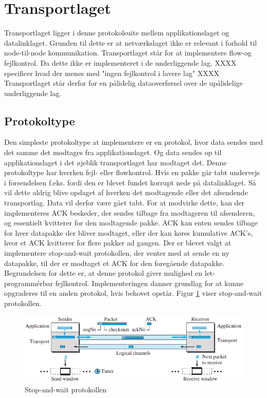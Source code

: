 \section{Transportlaget}
Transportlaget ligger i denne protokolsuite mellem applikationslaget og datalinklaget. Grunden til dette er at netværkslaget ikke er relevant i forhold til node-til-node kommunikation. Transportlaget står for at implementere flow-og fejlkontrol. Da dette ikke er implementeret i de underliggende lag. XXXX specificer hvad der menes med "ingen fejlkontrol i lavere lag" XXXX Transportlaget står derfor for en pålidelig dataoverførsel over de upålidelige underliggende lag.

\subsection{Protokoltype}
Den simpleste protokoltype at implementere er en protokol, hvor data sendes med det samme det modtages fra applikationslaget. Og data sendes op til applikationslaget i det øjeblik transportlaget har modtaget det. Denne protokoltype har hverken fejl- eller flowkontrol. Hvis en pakke går tabt undervejs i forsendelsen f.eks. fordi den er blevet fundet korrupt nede på datalinklaget. Så vil dette aldrig blive opdaget af hverken det modtagende eller det afsendende transportlag. Data vil derfor være gået tabt. For at modvirke dette, kan der implementeres ACK beskeder, der sendes tilbage fra modtageren til afsenderen, og essentielt kvitterer for den modtagende pakke. ACK kan enten sendes tilbage for hver datapakke der bliver modtaget, eller der kan køres kumulative ACK's, hvor et ACK kvitterer for flere pakker ad gangen. Der er blevet valgt at implementere stop-and-wait protokollen, der venter med at sende en ny datapakke, til der er modtaget et ACK for den foregående datapakke. Begrundelsen for dette er, at denne protokol giver mulighed en let-programmérbar fejlkontrol. Implementeringen danner grundlag for at kunne opgraderes til en anden protokol, hvis behovet opstår. Figur \ref{StopAndWait} viser stop-and-wait protokollen.
\begin{figure}[h]
\centering
\includegraphics[scale=0.75]{Billeder/StopAndWait.png}
\caption{Stop-and-wait protokollen
\label{StopAndWait}}
\end{figure}

